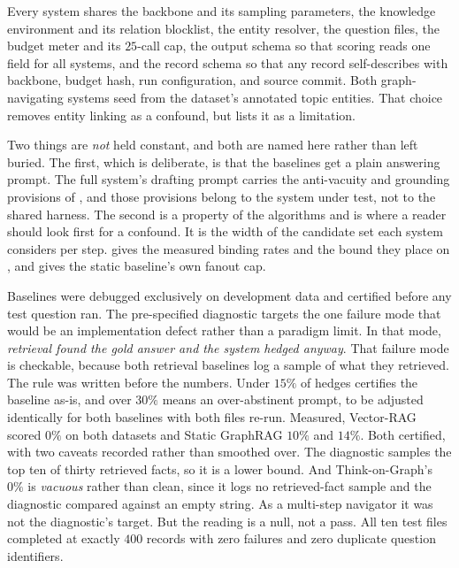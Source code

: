 Every system shares the backbone and its sampling parameters, the knowledge
environment and its relation blocklist, the entity resolver, the question files,
the budget meter and its $25$-call cap, the output schema so that scoring reads
one field for all systems, and the record schema so that any record
self-describes with backbone, budget hash, run configuration, and source commit.
Both graph-navigating systems seed from the dataset's annotated topic entities.
That choice removes entity linking as a confound, but  lists
it as a limitation.

Two things are \emph{not} held constant, and both are named here rather than
left buried. The first, which is deliberate, is that the baselines get a plain
answering prompt. The full system's drafting prompt carries the anti-vacuity and
grounding provisions of , and those provisions
belong to the system under test, not to the shared harness. The second is a
property of the algorithms and is where a reader should look first for a
confound. It is the width of the candidate set each system considers per step.
 gives the measured binding rates and the bound they
place on , and  gives the static
baseline's own fanout cap.

Baselines were debugged exclusively on development data and certified before any
test question ran. The pre-specified diagnostic targets the one failure mode
that would be an implementation defect rather than a paradigm limit. In that
mode, \emph{retrieval found the gold answer and the system hedged anyway}. That
failure mode is checkable, because both retrieval baselines log a sample of what
they retrieved. The rule was written before the numbers. Under $15\%$ of hedges
certifies the baseline as-is, and over $30\%$ means an over-abstinent prompt, to
be adjusted identically for both baselines with both files re-run. Measured,
Vector-RAG scored $0\%$ on both datasets and Static GraphRAG $10\%$ and $14\%$.
Both certified, with two caveats recorded rather than smoothed over. The
diagnostic samples the top ten of thirty retrieved facts, so it is a lower
bound. And Think-on-Graph's $0\%$ is \emph{vacuous} rather than clean, since it
logs no retrieved-fact sample and the diagnostic compared against an empty
string. As a multi-step navigator it was not the diagnostic's target. But the
reading is a null, not a pass. All ten test files completed at exactly $400$
records with zero failures and zero duplicate question identifiers.

